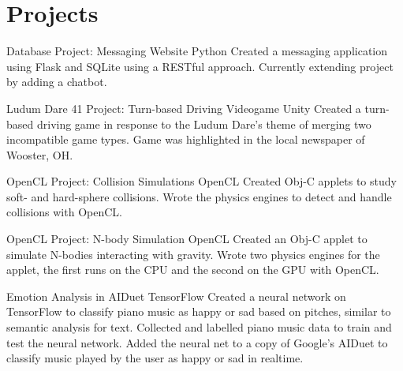 \documentclass[]{friggeri-cv}
\begin{document}
\section{Projects}
\begin{entrylist}
 {Database Project: Messaging Website}
 {Python}
 {Created a messaging application using Flask and SQLite using a RESTful approach. Currently extending project by adding a chatbot. \\}
 
 {Ludum Dare 41 Project: Turn-based Driving Videogame}
 {Unity}
 {Created a turn-based driving game in response to the Ludum Dare's theme of merging two incompatible game types. Game was highlighted in the local newspaper of Wooster, OH. \\}
 
 {OpenCL Project: Collision Simulations}
 {OpenCL}
 {Created Obj-C applets to study soft- and hard-sphere collisions. Wrote the physics engines to detect and handle collisions with OpenCL. \\}
 
 {OpenCL Project: N-body Simulation}
 {OpenCL}
 {Created an Obj-C applet to simulate N-bodies interacting with gravity. Wrote two physics engines for the applet, the first runs on the CPU and the second on the GPU with OpenCL.\\}
 
 {Emotion Analysis in AIDuet}
 {TensorFlow}
 {Created a neural network on TensorFlow to classify piano music as happy or sad based on pitches, similar to semantic analysis for text. Collected and labelled piano music data to train and test the neural network. Added the neural net to a copy of Google's AIDuet to classify music played by the user as happy or sad in realtime.\\}
  \end{entrylist}
\end{document}
